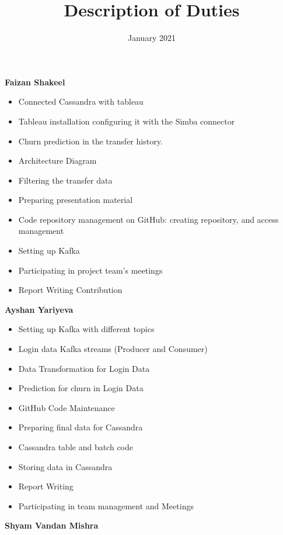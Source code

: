 \documentclass{article}
\title{Description of Duties}
\date{January 2021}
\begin{document}
\maketitle

\LARGE\textbf{Faizan Shakeel}

\begin{itemize}
  \item Connected Cassandra with tableau
  \item Tableau installation configuring it with the Simba connector
  \item Churn prediction in the transfer history.
  \item Architecture Diagram
  \item Filtering the transfer data
  \item Preparing presentation material 
  \item Code repository management on GitHub: creating repository, and access management
  \item Setting up Kafka
  \item Participating in project team’s meetings 
  \item Report Writing Contribution
\end{itemize}
\newpage
\LARGE\textbf{Ayshan Yariyeva}

\begin{itemize}
  \item Setting up Kafka with different topics
  \item Login data Kafka streams (Producer and Consumer)
  \item Data Transformation for Login Data
  \item Prediction for churn in Login Data
  \item GitHub Code Maintenance
  \item Preparing final data for Cassandra
  \item Cassandra table and batch code 
  \item Storing data in Cassandra
  \item Report Writing
  \item Participating in team management and Meetings
\end{itemize}
\newpage

\LARGE\textbf{Shyam Vandan Mishra}
\end{document}
